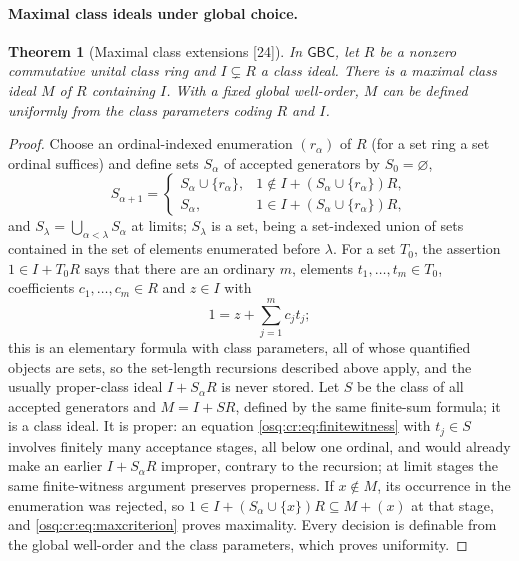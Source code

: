 \documentclass[11pt,letterpaper]{article}
\numberwithin{equation}{section}
\newtheorem{theorem}{Theorem}[section]
\theoremstyle{definition}
\theoremstyle{remark}
\theoremstyle{plain}
\newcommand{\src}[1]{\textup{\textsf{[#1]}}}
\begin{document}
\paragraph{Maximal class ideals under global choice.}

\begin{theorem}[Maximal class extensions \src{24}]\label{osq:cr:thm:krull}
In $\mathsf{GBC}$, let $R$ be a nonzero commutative unital class ring and $I\subsetneq R$ a class ideal. There is a maximal class ideal $M$ of $R$
containing $I$. With a fixed global well-order, $M$ can be defined uniformly from the class parameters coding $R$ and $I$.
\end{theorem}
\begin{proof}
Choose an ordinal-indexed enumeration $(r_\alpha)$ of $R$ (for a set ring a set ordinal suffices) and define sets $S_\alpha$ of accepted
generators by $S_0=\varnothing$,
\begin{equation}\label{osq:cr:eq:greedy}
 S_{\alpha+1}=\begin{cases}
 S_\alpha\cup\{r_\alpha\},&1\notin I+(S_\alpha\cup\{r_\alpha\})R,\\
 S_\alpha,&1\in I+(S_\alpha\cup\{r_\alpha\})R,
 \end{cases}
\end{equation}
and $S_\lambda=\bigcup_{\alpha<\lambda}S_\alpha$ at limits; $S_\lambda$ is a set, being a set-indexed union of sets contained in the set of elements
enumerated before $\lambda$. For a set $T_0$, the assertion $1\in I+T_0R$ says that there are an ordinary $m$, elements $t_1,\dots,t_m\in T_0$,
coefficients $c_1,\dots,c_m\in R$ and $z\in I$ with
\begin{equation}\label{osq:cr:eq:finitewitness}
 1=z+\sum_{j=1}^mc_jt_j ;
\end{equation}
this is an elementary formula with class parameters, all of whose quantified objects are sets, so the set-length recursions described above apply,
and the usually proper-class ideal $I+S_\alpha R$ is never stored. Let $S$ be the class of all accepted generators and $M=I+SR$, defined by the same
finite-sum formula; it is a class ideal. It is proper: an equation \eqref{osq:cr:eq:finitewitness} with $t_j\in S$ involves finitely many acceptance
stages, all below one ordinal, and would already make an earlier $I+S_\alpha R$ improper, contrary to the recursion; at limit stages the same
finite-witness argument preserves properness. If $x\notin M$, its occurrence in the enumeration was rejected, so
$1\in I+(S_\alpha\cup\{x\})R\subseteq M+(x)$ at that stage, and \eqref{osq:cr:eq:maxcriterion} proves maximality. Every decision is definable from
the global well-order and the class parameters, which proves uniformity.
\end{proof}
\end{document}
